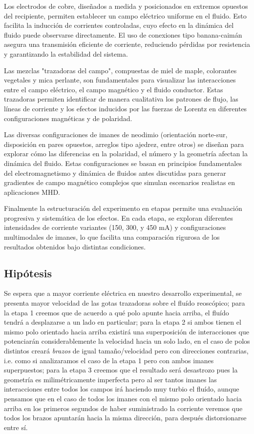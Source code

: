 \documentclass[article,12pt]{elsarticle}
\begin{document}
Los electrodos de cobre, diseñados a medida y posicionados en extremos opuestos del recipiente, permiten establecer un campo eléctrico uniforme en el fluido. Esto facilita la inducción de corrientes controladas, cuyo efecto en la dinámica del fluido puede observarse directamente. El uso de conexiones tipo banana-caimán asegura una transmisión eficiente de corriente, reduciendo pérdidas por resistencia y garantizando la estabilidad del sistema.

Las mezclas "trazadoras del campo", compuestas de miel de maple, colorantes vegetales y mica perlante, son fundamentales para visualizar las interacciones entre el campo eléctrico, el campo magnético y el fluido conductor. Estas trazadoras permiten identificar de manera cualitativa los patrones de flujo, las líneas de corriente y los efectos inducidos por las fuerzas de Lorentz en diferentes configuraciones magnéticas y de polaridad.

Las diversas configuraciones de imanes de neodimio (orientación norte-sur, disposición en pares opuestos, arreglos tipo ajedrez, entre otros) se diseñan para explorar cómo las diferencias en la polaridad, el número y la geometría afectan la dinámica del fluido. Estas configuraciones se basan en principios fundamentales del electromagnetismo y dinámica de fluidos antes discutidas para generar gradientes de campo magnético complejos que simulan escenarios realistas en aplicaciones MHD.

Finalmente la estructuración del experimento en etapas permite una evaluación progresiva y sistemática de los efectos. En cada etapa, se exploran diferentes intensidades de corriente variantes (150, 300, y 450 mA) y configuraciones multimodales de imanes, lo que facilita una comparación rigurosa de los resultados obtenidos bajo distintas condiciones.
    
    
    
    \subsection{Hipótesis}

Se espera que a mayor corriente eléctrica en nuestro desarrollo experimental, se presenta mayor velocidad de las gotas trazadoras sobre el fluído reoscópico; para la etapa 1 creemos que de acuerdo a qué polo apunte hacia arriba, el fluído tendrá a desplazarse a un lado en particular; para la etapa 2 si ambos tienen el mismo polo orientado hacia arriba existirá una superposición de interacciones que potenciarán considerablemente la velocidad hacia un solo lado, en el caso de polos distintos creará \textit{brazos} de igual tamaño/velocidad pero con direcciones contrarias, i.e. como si analizaramos el caso de la etapa 1 pero con ambos imanes superpuestos; para la etapa 3 creemos que el resultado será desastrozo pues la geometría es milimétricamente imperfecta pero al ser tantos imanes las interacciones entre todos los campos irá haciendo muy turbio el fluído, aunque pensamos que en el caso de todos los imanes con el mismo polo orientado hacia arriba en los primeros segundos de haber suministrado la corriente veremos que todos los brazos apuntarán hacia la misma dirección, para después distorsionarse entre sí.
    
\end{document}
